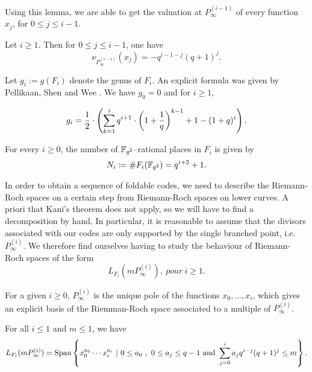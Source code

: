 \documentclass[10pt]{article}
\begin{document}
Using this lemma, we are able to get the valuation at $P_{\infty}^{(i-1)}$ of every function $x_j$, for $0 \leq j \leq i-1$.

\begin{corollary} \label{val pinf}
Let $i \geq 1$. Then for $0 \leq j \leq i-1$, one have
\[\nu_{P_{\infty}^{(i-1)}}(x_j) = - q^{i-1-j}(q+1)^j.\]
\end{corollary}

Let $g_i:=g(F_i)$ denote the genus of $F_i$. An explicit formula was given by Pellikaan, Shen and Wee \cite[Proposition 4]{PSW91}. We have $g_0=0$ and for $i\geq 1$, 

\begin{equation}\label{eq:genus_herm}
	g_i =\dfrac{1}{2} \cdot \left(\sum\limits_{k=1}^i q^{i+1} \cdot \left(1+\frac{1}{q}\right)^{k-1} +1 -(1+q)^i\right).
\end{equation}

For every $i \geq 0$, the number of $\mathbb{F}_{q^2}$--rational places in $F_i$ is given by
\[N_i \coloneqq \#F_i(\mathbb{F}_{q^2}) = q^{i+2}+1.\]

In order to obtain a sequence of foldable codes, we need to describe the Riemann-Roch spaces on a certain step from Riemann-Roch spaces on lower curves. A priori that Kani's theorem does not apply, so we will have to find a decomposition by hand. In particular, it is reasonable to assume that the divisors associated with our codes are only supported by the single branched point, i.e. $P^{(i)}_{\infty}$. We therefore find ourselves having to study the behaviour of Riemann-Roch spaces of the form 
\[L_{F_i}\left(mP^{(i)}_{\infty}\right), \ pour \ i \geq 1.\] 

For a given $i \geq 0$, $P^{(i)}_{\infty}$ is the unique pole of the functions $x_0,...,x_i$, which gives an explicit basis of the Riemman-Roch space associated to a multiple of $P^{(i)}_{\infty}$.

\begin{lemma}\label{lem:basis_herm}
For all $i \leq 1$ and $m \leq 1$, we have 
\[L_{F_i}(mP^{(i)}_{\infty}) = \operatorname{Span}\left\{x_0^{a_0} \cdots x_i^{a_i} \ | \ 0 \leq a_0 \ , \ 0 \leq a_j \leq q-1 \text{ and } \sum\limits_{j=0}^i a_jq^{i-j}(q+1)^j \leq m \right\}.\]
\end{lemma}

\subsection{}
\end{document}
